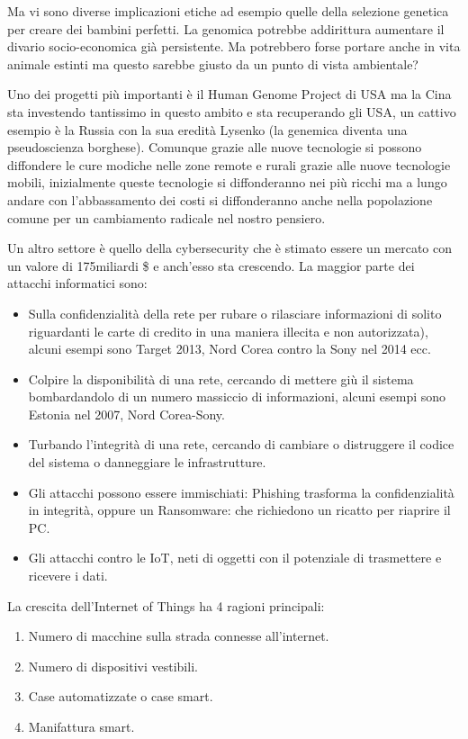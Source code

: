 \documentclass[a4page, 11pt]{article}
\begin{document}
Ma vi sono diverse implicazioni etiche ad esempio quelle della selezione
genetica per creare dei bambini perfetti. La genomica potrebbe
addirittura aumentare il divario socio-economica già persistente. Ma
potrebbero forse portare anche in vita animale estinti ma questo sarebbe
giusto da un punto di vista ambientale?

Uno dei progetti più importanti è il Human Genome Project di USA ma la
Cina sta investendo tantissimo in questo ambito e sta recuperando gli
USA, un cattivo esempio è la Russia con la sua eredità Lysenko (la
genemica diventa una pseudoscienza borghese). Comunque grazie alle nuove
tecnologie si possono diffondere le cure modiche nelle zone remote e
rurali grazie alle nuove tecnologie mobili, inizialmente queste
tecnologie si diffonderanno nei più ricchi ma a lungo andare con
l'abbassamento dei costi si diffonderanno anche nella popolazione comune
per un cambiamento radicale nel nostro pensiero.

Un altro settore è quello della cybersecurity che è stimato essere un
mercato con un valore di 175miliardi \$ e anch'esso sta crescendo. La
maggior parte dei attacchi informatici sono:

\begin{itemize}
	 
	\item
	Sulla confidenzialità della rete per rubare o rilasciare informazioni
	di solito riguardanti le carte di credito in una maniera illecita e
	non autorizzata), alcuni esempi sono Target 2013, Nord Corea contro la
	Sony nel 2014 ecc.
	\item
	Colpire la disponibilità di una rete, cercando di mettere giù il
	sistema bombardandolo di un numero massiccio di informazioni, alcuni
	esempi sono Estonia nel 2007, Nord Corea-Sony.
	\item
	Turbando l'integrità di una rete, cercando di cambiare o distruggere
	il codice del sistema o danneggiare le infrastrutture.
	\item
	Gli attacchi possono essere immischiati: Phishing trasforma la
	confidenzialità in integrità, oppure un Ransomware: che richiedono un
	ricatto per riaprire il PC.
	\item
	Gli attacchi contro le IoT, neti di oggetti con il potenziale di
	trasmettere e ricevere i dati.
\end{itemize}

La crescita dell'Internet of Things ha 4 ragioni principali:

\begin{enumerate}
	\def\labelenumi{\arabic{enumi}.}
	 
	\item
	Numero di macchine sulla strada connesse all'internet.
	\item
	Numero di dispositivi vestibili.
	\item
	Case automatizzate o case smart.
	\item
	Manifattura smart.
\end{enumerate}
\end{document}
